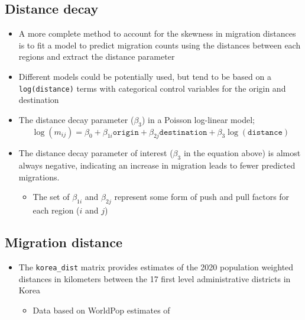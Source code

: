 \documentclass[
]{book}
\providecommand{\tightlist}{%
  \setlength{\itemsep}{0pt}\setlength{\parskip}{0pt}}
\begin{document}
\hypertarget{distance-decay}{%
\subsection{Distance decay}\label{distance-decay}}

\begin{itemize}
\tightlist
\item
  A more complete method to account for the skewness in migration distances is to fit a model to predict migration counts using the distances between each regions and extract the distance parameter
\item
  Different models could be potentially used, but tend to be based on a \texttt{log(distance)} terms with categorical control variables for the origin and destination
\item
  The distance decay parameter (\(\beta_3\)) in a Poisson log-linear model;
  \[
  \log(m_{ij}) = \beta_0 + \beta_{1i} \texttt{origin} + \beta_{2j} \texttt{destination} + \beta_{3} \log(\texttt{distance})
  \]
\item
  The distance decay parameter of interest (\(\beta_3\) in the equation above) is almost always negative, indicating an increase in migration leads to fewer predicted migrations.

  \begin{itemize}
  \tightlist
  \item
    The set of \(\beta_{1i}\) and \(\beta_{2j}\) represent some form of push and pull factors for each region (\(i\) and \(j\))
  \end{itemize}
\end{itemize}

\hypertarget{migration-distance-1}{%
\subsection{Migration distance}\label{migration-distance-1}}

\begin{itemize}
\tightlist
\item
  The \texttt{korea\_dist} matrix provides estimates of the 2020 population weighted distances in kilometers between the 17 first level administrative districts in Korea

  \begin{itemize}
  \tightlist
  \item
    Data based on WorldPop estimates of \citet{Edwards2021}
  \end{itemize}
\end{itemize}
\end{document}
